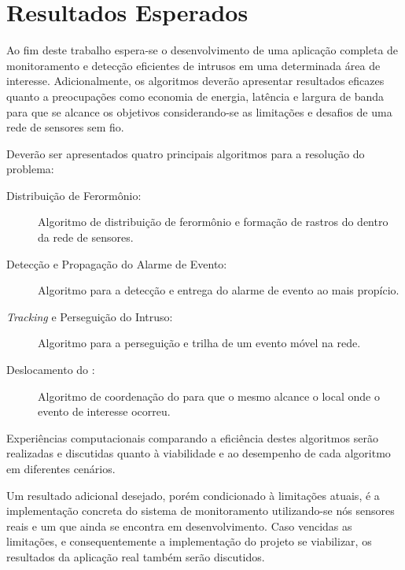 \chapter{Resultados Esperados}
\label{chap:Resultados Esperados}
 
Ao fim deste trabalho espera-se o desenvolvimento de uma aplicação completa de monitoramento e detecção eficientes de intrusos em uma determinada área de interesse.
Adicionalmente, os algoritmos deverão apresentar resultados eficazes quanto a preocupações como economia de energia, latência e largura de banda para que se alcance os objetivos considerando-se as limitações e desafios de uma rede de sensores sem fio.

Deverão ser apresentados quatro principais algoritmos para a resolução do problema:

\begin{description}
	\item[ Distribuição de Ferormônio:]  Algoritmo de distribuição de ferormônio e formação de rastros do \vant dentro da rede de sensores.
	\item[ Detecção e Propagação do Alarme de Evento:] Algoritmo para a detecção e entrega do alarme de evento ao \vant mais propício.
	\item[ \emph{Tracking} e Perseguição do Intruso:]  Algoritmo para a perseguição e trilha de um evento móvel na rede.
	\item[ Deslocamento do \vant: ] Algoritmo de coordenação do \vant para que o mesmo alcance o local onde o evento de interesse ocorreu.
\end{description}

Experiências computacionais comparando a eficiência destes algoritmos serão realizadas e discutidas quanto à viabilidade e ao desempenho de cada algoritmo em diferentes cenários.

Um resultado adicional desejado, porém condicionado à limitações atuais, é a implementação concreta do sistema de monitoramento utilizando-se nós sensores reais e um \vant que ainda se encontra em desenvolvimento. Caso vencidas as limitações, e consequentemente a implementação do projeto se viabilizar, os resultados da aplicação real também serão discutidos.